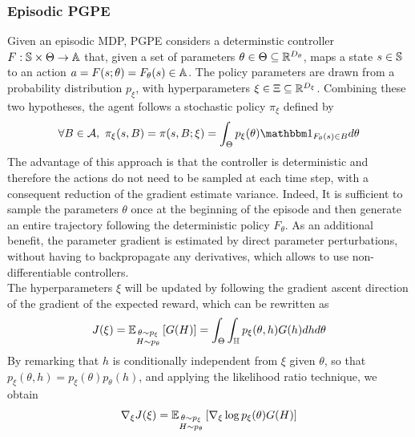 \subsubsection{Episodic PGPE}
Given an episodic MDP, PGPE considers a determinstic controller $F: \S \times
\Theta \to \A$ that, given a set of parameters $\theta \in \Theta \subseteq
\R^{D_\theta}$, maps a state $s \in \S$ to an action $a = F(s; \theta) =
F_\theta(s) \in \A$. The policy parameters are drawn from a probability distribution $p_\xi$, with hyperparameters $\xi \in \Xi \subseteq \R^{D_\xi}$. Combining these two
hypotheses, the agent follows a stochastic policy $\pi_\xi$ defined by
\begin{equation*}
	\forall B \in \calA ,\ \pi_\xi(s,B) = \pi(s, B; \xi) = \int_\Theta p_\xi(\theta) 
	\ind{F_{\theta}(s)\in B} d\theta
\end{equation*}
The advantage of this approach is that the controller is deterministic and
therefore the actions do not need to be sampled at each time step, with a
consequent reduction of the gradient estimate variance. Indeed, It is
sufficient to sample the parameters $\theta$ once at the beginning of the
episode and then generate an entire trajectory following the deterministic 
policy $F_\theta$. As an additional benefit, the parameter gradient is
estimated by direct parameter perturbations, without having to backpropagate
any derivatives, which allows to use non-differentiable controllers.\\
The hyperparameters $\xi$ will be updated by following the gradient ascent direction of the gradient of the expected reward, which can be rewritten as 
\begin{equation}
	\begin{split}
		J(\xi) = \E[\substack{\theta \sim p_\xi\\H \sim p_\theta}]{G(H)} =
		\int_\Theta \int_\H p_\xi(\theta, h) G(h) dh d\theta\\
	\end{split}
\end{equation}
By remarking that $h$ is conditionally independent from $\xi$ given $\theta$, so that $p_\xi(\theta, h) = p_\xi(\theta) p_\theta(h)$, and applying the likelihood ratio technique, we obtain
\begin{equation}
	\begin{split}
		\nabla_\xi J(\xi) = \E[\substack{\theta \sim p_\xi\\H \sim p_\theta}]{\nabla_\xi \log p_\xi(\theta) G(H)}
	\end{split}
\end{equation}
